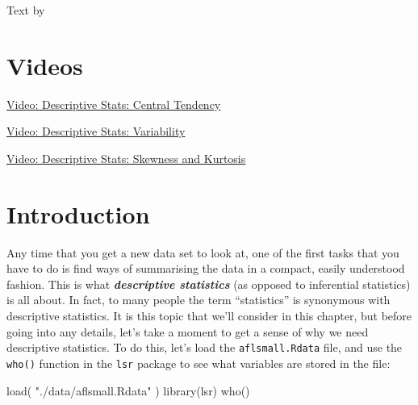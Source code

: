 \documentclass[
]{book}
\newenvironment{Shaded}{\begin{snugshade}}{\end{snugshade}}
\newcommand{\FunctionTok}[1]{\textcolor[rgb]{0.00,0.00,0.00}{#1}}
\newcommand{\NormalTok}[1]{#1}
\newcommand{\StringTok}[1]{\textcolor[rgb]{0.31,0.60,0.02}{#1}}
\begin{document}
Text by \citet{Navarro2018}

\hypertarget{videos-1}{%
\section{Videos}\label{videos-1}}

\href{https://youtu.be/uBYjfNj4lT4}{Video: Descriptive Stats: Central Tendency}

\href{https://youtu.be/KpDrrgMSpUU}{Video: Descriptive Stats: Variability}

\href{https://youtu.be/3BHpcqXYhtQ}{Video: Descriptive Stats: Skewness and Kurtosis}

\hypertarget{introduction-2}{%
\section{Introduction}\label{introduction-2}}

Any time that you get a new data set to look at, one of the first tasks that you have to do is find ways of summarising the data in a compact, easily understood fashion. This is what \textbf{\emph{descriptive statistics}} (as opposed to inferential statistics) is all about. In fact, to many people the term ``statistics'' is synonymous with descriptive statistics. It is this topic that we'll consider in this chapter, but before going into any details, let's take a moment to get a sense of why we need descriptive statistics. To do this, let's load the \texttt{aflsmall.Rdata} file, and use the \texttt{who()} function in the \texttt{lsr} package to see what variables are stored in the file:

\begin{Shaded}
\begin{Highlighting}[]
\FunctionTok{load}\NormalTok{( }\StringTok{"./data/aflsmall.Rdata"}\NormalTok{ )}
\FunctionTok{library}\NormalTok{(lsr)}
\FunctionTok{who}\NormalTok{()}
\end{Highlighting}
\end{Shaded}
\end{document}
